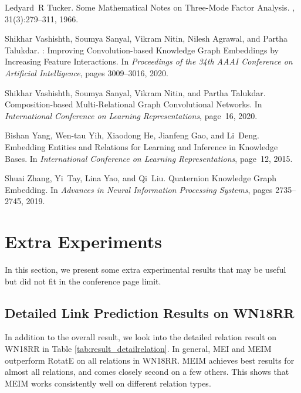 \documentclass{article}
\theoremstyle{plain}
\theoremstyle{remark}
\begin{document}
\begin{thebibliography}{}
Ledyard~R Tucker.
\newblock Some {{Mathematical Notes}} on {{Three-Mode Factor Analysis}}.
, 31(3):279--311, 1966.

Shikhar Vashishth, Soumya Sanyal, Vikram Nitin, Nilesh Agrawal, and Partha
  Talukdar.
: {{Improving Convolution-based Knowledge Graph
  Embeddings}} by {{Increasing Feature Interactions}}.
\newblock In {\em Proceedings of the 34th {{AAAI Conference}} on {{Artificial
  Intelligence}}}, pages 3009--3016, 2020.

Shikhar Vashishth, Soumya Sanyal, Vikram Nitin, and Partha Talukdar.
\newblock Composition-based {{Multi-Relational Graph Convolutional Networks}}.
\newblock In {\em International {{Conference}} on {{Learning
  Representations}}}, page~16, 2020.

Bishan Yang, Wen-tau Yih, Xiaodong He, Jianfeng Gao, and Li~Deng.
\newblock Embedding {{Entities}} and {{Relations}} for {{Learning}} and
  {{Inference}} in {{Knowledge Bases}}.
\newblock In {\em International {{Conference}} on {{Learning
  Representations}}}, page~12, 2015.

Shuai Zhang, Yi~Tay, Lina Yao, and Qi~Liu.
\newblock Quaternion {{Knowledge Graph Embedding}}.
\newblock In {\em Advances in {{Neural Information Processing Systems}}}, pages
  2735--2745, 2019.

\end{thebibliography}
 

\clearpage
\appendix


\section{Extra Experiments}
In this section, we present some extra experimental results that may be useful but did not fit in the conference page limit.

\subsection{Detailed Link Prediction Results on WN18RR}
In addition to the overall result, we look into the detailed relation result on WN18RR in Table \ref{tab:result_detailrelation}. In general, MEI and MEIM outperform RotatE on all relations in WN18RR. MEIM achieves best results for almost all relations, and comes closely second on a few others. This shows that MEIM works consistently well on different relation types.
\end{document}
